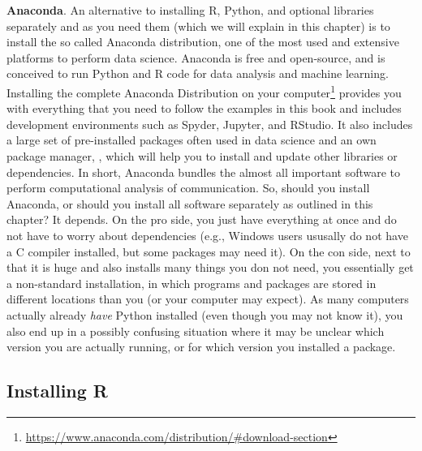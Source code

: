\begin{feature}\textbf{Anaconda}. An alternative to installing 
  R, Python, and optional libraries separately and as you need them
  (which we will explain in this chapter) is to install the so called
  Anaconda distribution, one of the most used and extensive platforms
  to perform data science. Anaconda is free and open-source, and is
  conceived to run Python and R code for data analysis and machine
  learning. Installing the complete Anaconda Distribution on your
  computer\footnote{\url{https://www.anaconda.com/distribution/\#download-section}}
  provides you with everything that you need to follow the examples in
  this book and includes development environments such as Spyder,
  Jupyter, and RStudio. It also includes a large set of pre-installed
  packages often used in data science and an own package manager,
  , which will help you to install and update other
  libraries or dependencies. In short, Anaconda bundles the almost all
  important software to perform computational analysis of
  communication.  So, should you install Anaconda, or should you
  install all software separately as outlined in this chapter? It
  depends. On the pro side, you just have everything at once and do
  not have to worry about dependencies (e.g., Windows users ususally
  do not have a C compiler installed, but some packages may need
  it). On the con side, next to that it is huge and also installs many
  things you don not need, you essentially get a non-standard
  installation, in which programs and packages are stored in different
  locations than you (or your computer may expect).  As many computers
  actually already \emph{have} Python installed (even though you may
  not know it), you also end up in a possibly confusing situation
  where it may be unclear which version you are actually running, or
  for which version you installed a package.
\end{feature}



\subsection{Installing R}

